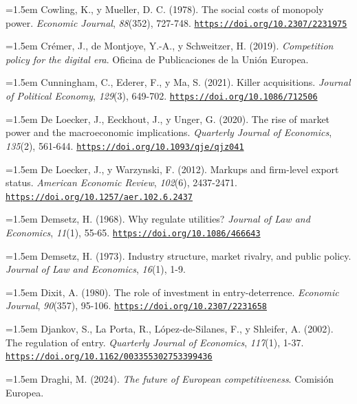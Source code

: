 \documentclass[10pt,a4paper]{article}
\begin{document}
\noindent\hangindent=1.5em Cowling, K., y Mueller, D. C. (1978). The social costs of monopoly power. \textit{Economic Journal}, \textit{88}(352), 727-748. \href{https://doi.org/10.2307/2231975}{\nolinkurl{https://doi.org/10.2307/2231975}}

\noindent\hangindent=1.5em Crémer, J., de Montjoye, Y.-A., y Schweitzer, H. (2019). \textit{Competition policy for the digital era}. Oficina de Publicaciones de la Unión Europea.

\noindent\hangindent=1.5em Cunningham, C., Ederer, F., y Ma, S. (2021). Killer acquisitions. \textit{Journal of Political Economy}, \textit{129}(3), 649-702. \href{https://doi.org/10.1086/712506}{\nolinkurl{https://doi.org/10.1086/712506}}

\noindent\hangindent=1.5em De Loecker, J., Eeckhout, J., y Unger, G. (2020). The rise of market power and the macroeconomic implications. \textit{Quarterly Journal of Economics}, \textit{135}(2), 561-644. \href{https://doi.org/10.1093/qje/qjz041}{\nolinkurl{https://doi.org/10.1093/qje/qjz041}}

\noindent\hangindent=1.5em De Loecker, J., y Warzynski, F. (2012). Markups and firm-level export status. \textit{American Economic Review}, \textit{102}(6), 2437-2471. \href{https://doi.org/10.1257/aer.102.6.2437}{\nolinkurl{https://doi.org/10.1257/aer.102.6.2437}}

\noindent\hangindent=1.5em Demsetz, H. (1968). Why regulate utilities? \textit{Journal of Law and Economics}, \textit{11}(1), 55-65. \href{https://doi.org/10.1086/466643}{\nolinkurl{https://doi.org/10.1086/466643}}

\noindent\hangindent=1.5em Demsetz, H. (1973). Industry structure, market rivalry, and public policy. \textit{Journal of Law and Economics}, \textit{16}(1), 1-9.

\noindent\hangindent=1.5em Dixit, A. (1980). The role of investment in entry-deterrence. \textit{Economic Journal}, \textit{90}(357), 95-106. \href{https://doi.org/10.2307/2231658}{\nolinkurl{https://doi.org/10.2307/2231658}}

\noindent\hangindent=1.5em Djankov, S., La Porta, R., López-de-Silanes, F., y Shleifer, A. (2002). The regulation of entry. \textit{Quarterly Journal of Economics}, \textit{117}(1), 1-37. \href{https://doi.org/10.1162/003355302753399436}{\nolinkurl{https://doi.org/10.1162/003355302753399436}}

\noindent\hangindent=1.5em Draghi, M. (2024). \textit{The future of European competitiveness}. Comisión Europea.
\end{document}

